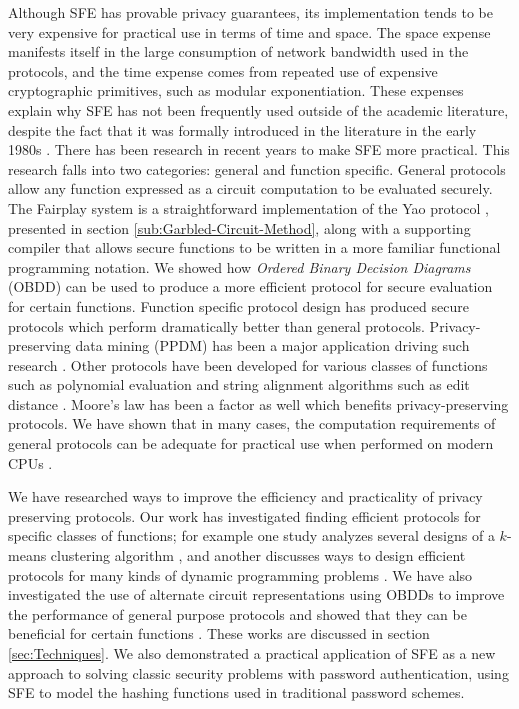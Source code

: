 Although SFE has provable privacy guarantees, its implementation tends
to be very expensive for practical use in terms of time and space.
The space expense manifests itself in the large consumption of network
bandwidth used in the protocols, and the time expense comes from repeated
use of expensive cryptographic primitives, such as modular exponentiation.
These expenses explain why SFE has not been frequently used outside
of the academic literature, despite the fact that it was formally
introduced in the literature in the early 1980s \cite{Y82}. There has
been research in recent years to make SFE more practical. This research
falls into two categories: general and function specific. General
protocols allow any function expressed as a circuit computation to
be evaluated securely. The Fairplay system \cite{Fairplay} is a straightforward
implementation of the Yao protocol \cite{Yao86}, presented in section
\ref{sub:Garbled-Circuit-Method}, along with a supporting compiler
that allows secure functions to be written in a more familiar functional
programming notation. We showed
how \emph{Ordered Binary Decision Diagrams} (OBDD)  can be used to
produce a more efficient protocol for secure evaluation for certain
functions\cite{kruger06}. Function specific protocol design has produced secure protocols
which perform dramatically better than general protocols. Privacy-preserving data mining (PPDM) has been a major application driving
such research \cite{verykios04stateart}. Other protocols have been
developed for various classes of functions such as polynomial evaluation
\cite{naor99otope} and string alignment algorithms such as edit distance
\cite{kruger07}.  Moore's law has been a factor as well which benefits privacy-preserving protocols.
We have shown that in many
cases, the computation requirements of general protocols
can be adequate for practical use when performed on modern
CPUs \cite{kruger06,kruger10}.

We have researched ways to improve the efficiency and practicality
of privacy preserving protocols. Our work has investigated finding
efficient protocols for specific classes of functions; for example
one study analyzes several designs of a $k$-means clustering algorithm
\cite{kruger05}, and another discusses ways to design efficient protocols
for many kinds of dynamic programming problems \cite{kruger07}. We
have also investigated the use of alternate circuit representations
using OBDDs to improve the performance of general purpose protocols
and showed that they can be beneficial for certain functions \cite{kruger06}.
These works are discussed in section \ref{sec:Techniques}.
We also demonstrated a practical application of SFE as a new approach
to solving classic security problems with password authentication, using
SFE to model the hashing functions used in traditional password schemes.
\cite{kruger10}

